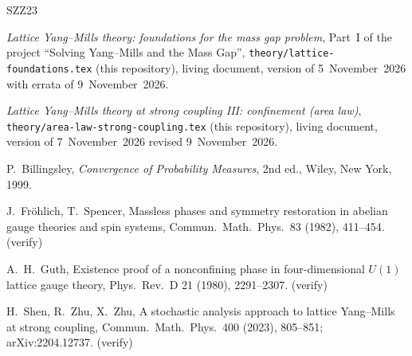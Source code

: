 \documentclass[11pt,a4paper]{article}
\theoremstyle{definition}
\theoremstyle{remark}
\begin{document}
\begin{thebibliography}{SZZ23}

\emph{Lattice Yang--Mills theory: foundations for the mass gap problem}, Part~I of the project ``Solving Yang--Mills
and the Mass Gap'', \texttt{theory/lattice-foundations.tex} (this repository), living document, version of
5~November~2026 with errata of 9~November~2026.

\emph{Lattice Yang--Mills theory at strong coupling III: confinement (area law)}, \texttt{theory/area-law-strong-coupling.tex}
(this repository), living document, version of 7~November~2026 revised 9~November~2026.

P.~Billingsley, \emph{Convergence of Probability Measures}, 2nd ed., Wiley, New York, 1999.

J.~Fröhlich, T.~Spencer, Massless phases and symmetry restoration in abelian gauge theories and spin systems,
Commun.\ Math.\ Phys.\ 83 (1982), 411--454. (verify)

A.~H.~Guth, Existence proof of a nonconfining phase in four-dimensional $U(1)$ lattice gauge theory, Phys.\ Rev.\ D 21
(1980), 2291--2307. (verify)

H.~Shen, R.~Zhu, X.~Zhu, A stochastic analysis approach to lattice Yang--Mills at strong coupling,
Commun.\ Math.\ Phys.\ 400 (2023), 805--851; arXiv:2204.12737. (verify)

\end{thebibliography}
\end{document}
